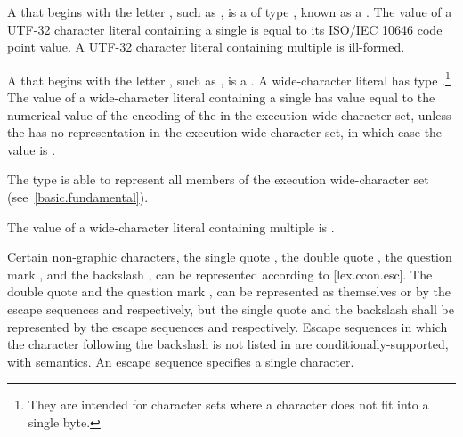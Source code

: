 \documentclass{wg21}
\begin{document}
\begin{removedblock}
\pnum
{}%
%
A  that
begins with the letter , such as ,
%
is a  of type ,
known as a .
The value of a
UTF-32 character literal containing a single  is equal
to its ISO/IEC 10646 code point value.
A UTF-32 character literal containing
multiple  is ill-formed.

\pnum
{}%
%
%
%
A  that
begins with the letter , such as ,
%
is a . A wide-character literal has type
.\footnote{They are intended for character sets where a character does
    not fit into a single byte. }
The value of a wide-character literal containing a single
 has value equal to the numerical value of the encoding
of the  in the execution wide-character set, unless the
 has no representation in the execution wide-character set, in which
case the value is .
\begin{note}
    The type  is able to
    represent all members of the execution wide-character set (see~\ref{basic.fundamental}).
\end{note}
The value
of a wide-character literal containing multiple  is
.


\pnum
Certain non-graphic characters, the single quote , the double quote ,
the question mark ,
and the backslash
%
%
%
\tcode{\textbackslash}, can be represented according to [lex.ccon.esc].
%
The double quote   and the question mark , can be
represented as themselves or by the escape sequences
 and  respectively, but
the single quote  and the backslash \tcode{\textbackslash}
shall be represented by the escape sequences  and
\tcode{\textbackslash\textbackslash} respectively. Escape sequences in
which the character following the backslash is not listed in
 are conditionally-supported, with  semantics. An escape sequence specifies a single
character.

\end{removedblock}
\end{document}
